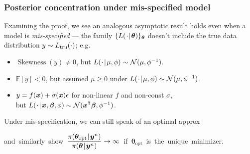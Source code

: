 \documentclass[18pt, handout]{beamer}
\newcommand{\defineTightItemizeSpacing}{%
	\setlength{\abovedisplayskip}{.25\baselineskip}%
	\setlength{\belowdisplayskip}{.25\baselineskip}%
}
\newenvironment{tightEquation*}{%
	\defineTightItemizeSpacing%
	\begin{equation*}
}{
	\end{equation*} \ignorespacesafterend
}
\newenvironment{narrowItemize}[1][]{%
  \vspace{-.3\baselineskip}%
  \begin{itemize}[#1]
  \addtolength\itemsep{-.1\baselineskip}
}{
  \end{itemize}
}
\newcommand{\given}{\thinnerspace | \thinnerspace}
\DeclareMathOperator*{\argmin}{argmin}
\newcommand{\transpose}{\text{\raisebox{.5ex}{$\intercal$}}}
\newcommand{\thinnerspace}{\mskip.5\thinmuskip}
\newcommand{\expectation}{\mathbb{E}}
\newcommand{\normalDist}{\mathcal{N}}
\newcommand{\kldivergence}{D_{\mathrm{KL}}}
\newcommand{\density}{\pi}
\newcommand{\likelihood}{L}
\newcommand{\by}{\bm{y}}
\newcommand{\btheta}{\bm{\theta}}
\begin{document}
\begin{frame}
\frametitle{Posterior concentration under mis-specified model}
Examining the proof, we see an analogous asymptotic result holds even when a model is \textit{mis-specified} --- 
the family $\{ \likelihood(\thinnerspace \cdot \given \btheta) \}_{\btheta}$ doesn't include the true data distribution $y \sim \likelihood_\truthSub(\cdot)$; e.g.\
\begin{narrowItemize}
\item $\operatorname{Skewness}(y) \neq 0$, but $\likelihood(\thinnerspace \cdot \given \mu, \phi) \sim \normalDist(\mu, \phi^{-1})$.
\item $\expectation[y] < 0$, but assumed $\mu \geq 0$ under $\likelihood(\thinnerspace \cdot \given \mu, \phi) \sim \normalDist(\mu, \phi^{-1})$.
\item $y = f(\bm{x}) + \sigma(\bm{x}) \epsilon$ for non-linear $f$ and non-const $\sigma$, \\ but $\likelihood(\thinnerspace \cdot \given \bx, \bbeta, \phi) \sim \normalDist(\bx^\transpose \bbeta, \phi^{-1})$.
\end{narrowItemize}

Under mis-specification, we can still speak of an optimal approx
\begin{tightEquation*}
\btheta_{}
	= \textstyle \argmin_{\btheta} \kldivergence\!\left(
		\likelihood(\thinnerspace \cdot \given \btheta) \, \| \, \likelihood_\truthSub
	\right),
\end{tightEquation*}
\mbox{and similarly show $\displaystyle \frac{\density(\btheta_{\mathrm{opt}} \given \by^n)}{\density(\btheta \given \by^n)}
\to \infty$ if $\btheta_{\mathrm{opt}}\!$ is the unique minimizer.}
\end{frame}
\end{document}
